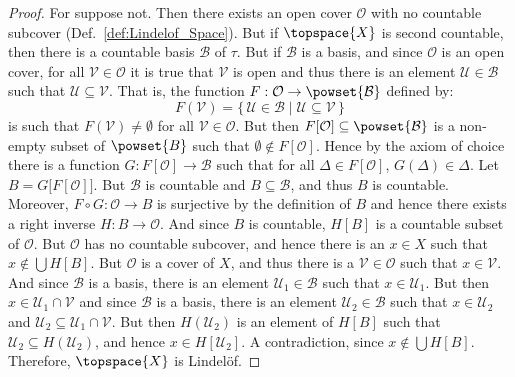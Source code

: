        \begin{proof}
            For suppose not. Then there exists an open cover $\mathcal{O}$
            with no countable subcover (Def.~\ref{def:Lindelof_Space}). But
            if $\topspace{X}$ is second countable, then there is a countable
            basis $\mathcal{B}$ of $\tau$. But if $\mathcal{B}$ is a basis,
            and since $\mathcal{O}$ is an open cover, for all
            $\mathcal{V}\in\mathcal{O}$ it is true that $\mathcal{V}$ is
            open and thus there is an element $\mathcal{U}\in\mathcal{B}$
            such that $\mathcal{U}\subseteq\mathcal{V}$. That is, the
            function $F:\mathcal{O}\rightarrow\powset{\mathcal{B}}$ defined
            by:
            \begin{equation}
                F(\mathcal{V})=\{\,\mathcal{U}\in\mathcal{B}\;|\;
                    \mathcal{U}\subseteq\mathcal{V}\,\}
            \end{equation}
            is such that $F(\mathcal{V})\ne\emptyset$ for all
            $\mathcal{V}\in\mathcal{O}$. But then
            $F[\mathcal{O}]\subseteq\powset{\mathcal{B}}$ is a non-empty subset
            of $\powset{B}$ such that $\emptyset\notin{F}[\mathcal{O}]$. Hence
            by the axiom of choice there is a function
            $G:F[\mathcal{O}]\rightarrow\mathcal{B}$ such that for all
            $\Delta\in{F}[\mathcal{O}]$, $G(\Delta)\in\Delta$. Let
            $B=G\big[F[\mathcal{O}]\big]$. But $\mathcal{B}$ is countable and
            $B\subseteq\mathcal{B}$, and thus $B$ is countable. Moreover,
            $F\circ{G}:\mathcal{O}\rightarrow{B}$ is surjective by the
            definition of $B$ and hence there exists a right inverse
            $H:B\rightarrow\mathcal{O}$. And since $B$ is countable,
            $H[B]$ is a countable subset of $\mathcal{O}$. But $\mathcal{O}$ has
            no countable subcover, and hence there is an $x\in{X}$ such that
            $x\notin\bigcup{H}[B]$. But $\mathcal{O}$ is a cover of $X$, and
            thus there is a $\mathcal{V}\in\mathcal{O}$ such that
            $x\in\mathcal{V}$. And since $\mathcal{B}$ is a basis, there is an
            element $\mathcal{U}_{1}\in\mathcal{B}$ such that
            $x\in\mathcal{U}_{1}$. But then $x\in\mathcal{U}_{1}\cap\mathcal{V}$
            and since $\mathcal{B}$ is a basis, there is an element
            $\mathcal{U}_{2}\in\mathcal{B}$ such that $x\in\mathcal{U}_{2}$ and
            $\mathcal{U}_{2}\subseteq\mathcal{U}_{1}\cap\mathcal{V}$. But then
            $H(\mathcal{U}_{2})$ is an element of $H[B]$ such that
            $\mathcal{U}_{2}\subseteq{H}(\mathcal{U}_{2})$, and hence
            $x\in{H}[\mathcal{U}_{2}]$. A contradiction, since
            $x\notin\bigcup{H}[B]$. Therefore, $\topspace{X}$ is Lindel\"{o}f.
        \end{proof}
